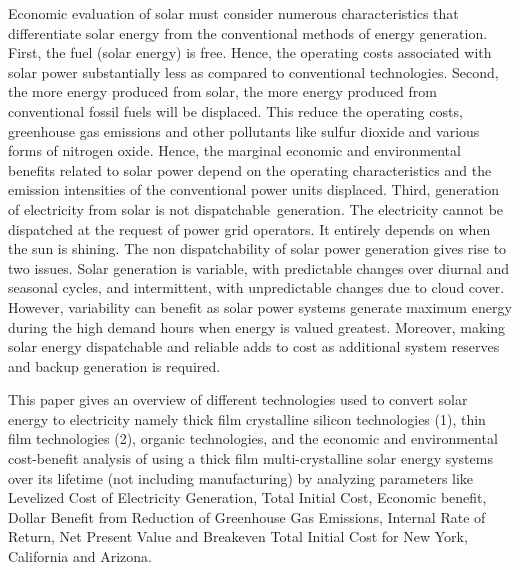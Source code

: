 \documentclass[12pt]{article}
\begin{document}
\vspace{\baselineskip}
\begin{justify}
Economic evaluation of solar must consider numerous characteristics that differentiate solar energy from the conventional methods of energy generation. First, the fuel (solar energy) is free. Hence, the operating costs associated with solar power substantially less as compared to conventional technologies. Second, the more energy produced from solar, the more energy produced from conventional fossil fuels will be displaced. This reduce the operating costs, greenhouse gas emissions and other pollutants like sulfur dioxide and various forms of nitrogen oxide. Hence, the marginal economic and environmental benefits related to solar power depend on the operating characteristics and the emission intensities of the conventional power units displaced. Third, generation of electricity from solar is not dispatchable\ generation.  The electricity cannot be dispatched at the request of power grid operators. It entirely depends on when the sun is shining. The non dispatchability of solar power generation gives rise to two issues. Solar generation is variable, with predictable changes over diurnal and seasonal cycles, and intermittent, with unpredictable changes due to cloud cover. However, variability can benefit as solar power systems generate maximum energy during the high demand hours when energy is valued greatest. Moreover, making solar energy dispatchable and reliable adds to cost as additional system reserves and backup generation is required.
\end{justify}\par


\vspace{\baselineskip}
\begin{justify}
This paper gives an overview of different technologies used to convert solar energy to electricity namely thick film crystalline silicon technologies (1), thin film technologies (2), organic technologies, and the economic and environmental cost-benefit analysis of using a thick film multi-crystalline solar energy systems over its lifetime (not including manufacturing) by analyzing parameters like Levelized Cost of Electricity Generation, Total Initial Cost, Economic benefit, Dollar Benefit from Reduction of Greenhouse Gas Emissions, Internal Rate of Return, Net Present Value and Breakeven Total Initial Cost for New York, California and Arizona. 
\end{justify}\par
\end{document}

